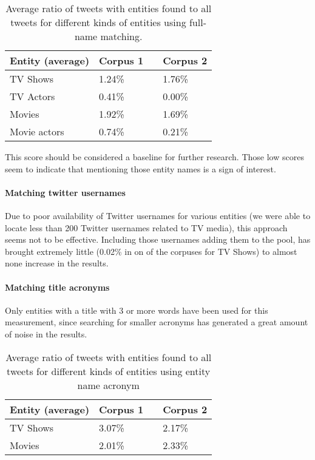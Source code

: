 \begin{center}
  \begin{table}[h!b!p!]
    \begin{tabular}{ | p{4cm} | p{2cm} | p{1cm}| p{2cm} | } \hline
      Entity (average) & Corpus 1 & & Corpus 2 \\ \hline
      TV Shows & 1.24\% & & 1.76\% \\ \hline
      TV Actors & 0.41\% & & 0.00\% \\ \hline
      Movies & 1.92\% & & 1.69\% \\ \hline
      Movie actors & 0.74\% & & 0.21\% \\ \hline
    \end{tabular}
    \caption{Average ratio of tweets with entities found to all tweets for different kinds of entities using full-name matching.}
  \end{table}
\end{center}

This score should be considered a baseline for further research. Those low scores seem to indicate
that mentioning those entity names is a sign of interest.

\paragraph{Matching twitter usernames}
Due to poor availability of Twitter usernames for various entities (we were able to locate less than 200 Twitter
usernames related to TV media), this approach seems not to be effective. Including those usernames adding them to the pool,
has brought extremely little (0.02\% in on of the corpuses for TV Shows) to almost none increase in the results.

\paragraph{Matching title acronyms}
Only entities with a title with 3 or more words have been used for this measurement, since searching
for smaller acronyms has generated a great amount of noise in the results.

\begin{center}
  \begin{table}[h!b!p!]
    \begin{tabular}{ | p{4cm} | p{2cm} | p{1cm}| p{2cm} | } \hline
      Entity (average) & Corpus 1 & & Corpus 2 \\ \hline
      TV Shows & 3.07\% & & 2.17\% \\ \hline
      Movies & 2.01\% & & 2.33\% \\ \hline
    \end{tabular}
    \caption{Average ratio of tweets with entities found to all tweets for different kinds of entities using entity name acronym}
  \end{table}
\end{center}

